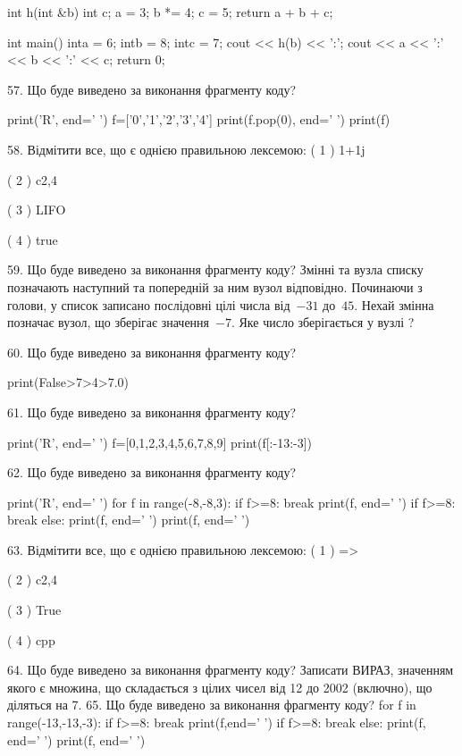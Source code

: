 \documentclass[11pt]{article}
\begin{document}
int h(int &b){
int c;    a = 3;
    b *= 4;
    c = 5;
    return a + b + c;
}

int main(){
    inta = 6;
    intb = 8;
    intc = 7;
    cout << h(b) << ':';
    cout << a << ':' << b << ':' << c;
    return 0; 
}

57. Що буде виведено за виконання фрагменту коду?

print('R', end=' ')
f=['0','1','2','3','4']
print(f.pop(0), end=' ')
print(f)


58. %
Відмітити все, що є однією правильною лексемою:
( 1 ) 1+1j

( 2 ) c2,4

( 3 ) LIFO

( 4 ) true

59. Що буде виведено за виконання фрагменту коду?
Змінні  та  вузла списку позначають наступний та попередній за ним вузол відповідно. Починаючи з голови, у список записано послідовні цілі числа від~$-31$ до~$45$. Нехай змінна  позначає вузол, що зберігає значення~$-7$.
Яке число зберігається у вузлі  ?

60. Що буде виведено за виконання фрагменту коду?

print(False>7>4>7.0)

61. Що буде виведено за виконання фрагменту коду?

print('R', end=' ')
f=[0,1,2,3,4,5,6,7,8,9]
print(f[:-13:-3])


62. Що буде виведено за виконання фрагменту коду?

print('R', end=' ')
for f in range(-8,-8,3):
    if f>=8:
        break
        print(f, end=' ')
    if f>=8:
        break
    else:
        print(f, end=' ')
    print(f, end=' ')

63. %
Відмітити все, що є однією правильною лексемою:
( 1 ) =>

( 2 ) c2,4

( 3 ) True

( 4 ) cpp

64. Що буде виведено за виконання фрагменту коду?
Записати ВИРАЗ, значенням якого є множина, що складається з цілих чисел від 12 до 2002 (включно), що діляться на 7.
65. Що буде виведено за виконання фрагменту коду?
for f in range(-13,-13,-3):
    if f>=8:
        break
        print(f,end=' ')
    if f>=8:
        break
else:
    print(f, end=' ')
print(f, end=' ')
\end{document}
